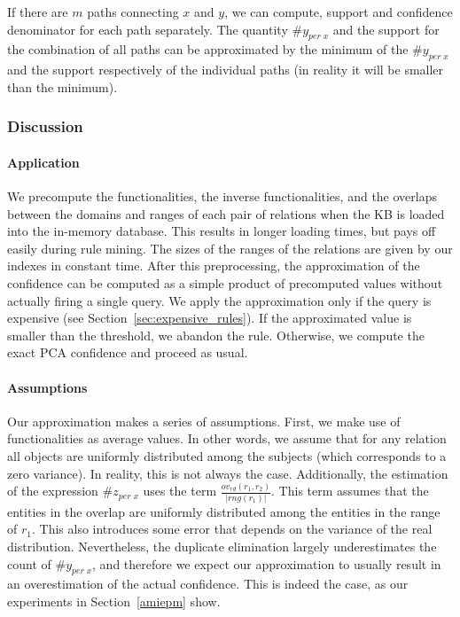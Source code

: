 {If there are $m$ paths connecting $x$ and $y$, we can compute, support and confidence denominator for each path separately.
The quantity $\#y_{per\;x}$ and the support for the combination of all paths can be approximated by the minimum of the $\#y_{per\;x}$ and the support 
respectively of the individual paths (in reality it will be smaller than the minimum). 
}

\subsubsection{Discussion}\label{sec:appr_discussion}

\paragraph{Application} We precompute the functionalities,
the inverse functionalities, and the overlaps between the domains and ranges of each pair of relations when the KB is loaded
into the in-memory database. This results in longer loading times, but pays off easily during rule mining. The sizes of the ranges of the relations are given by
our indexes in constant time.
After this preprocessing, the approximation of the confidence can be computed as a simple product of precomputed values without actually firing a single query.
We apply the approximation only if the query is expensive (see Section~\ref{sec:expensive_rules}).
If the approximated value is smaller than the threshold, we abandon the rule.
Otherwise, we compute the exact PCA confidence and proceed as usual.

\paragraph{Assumptions} Our approximation makes a series of assumptions.
First, we make use of functionalities as average values. In other words, we assume that for any relation all objects are uniformly distributed among the subjects (which corresponds to a zero variance).
In reality, this is not always the case. Additionally,
the estimation of the expression $\#z_{per \; x}$ uses the term $\frac{ov_{rd}(r_1,r_2)}{|rng(r_1)|}$.
This term assumes that the entities in the overlap are uniformly distributed among the entities in the range of $r_1$. 
This also introduces some error that depends on the variance of the real distribution.
Nevertheless, the duplicate elimination largely underestimates the count of $\#y_{per\;x}$, and therefore we expect our approximation to usually
result in an overestimation of the actual confidence. This is indeed the case, as our experiments in Section~\ref{amiepm} show.


